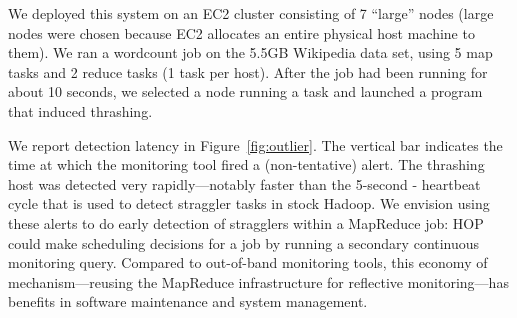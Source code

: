 We deployed this system on an EC2 cluster consisting of 7 ``large''
nodes (large nodes were chosen because EC2 allocates an entire
physical host machine to them). We ran a wordcount job on the 5.5GB Wikipedia
data set, using 5 map tasks and 2 reduce tasks (1 task per host). After
the job had been running for about 10 seconds, we selected a node
running a task and launched a program that induced thrashing.

We report detection latency in Figure~\ref{fig:outlier}. The vertical bar
indicates the time at which the monitoring tool fired a (non-tentative)
alert. The thrashing host was detected very rapidly---notably faster than the
5-second {\TT}-{\JT} heartbeat cycle that is used to detect straggler tasks in
stock Hadoop. We envision using these alerts to do early detection of stragglers
within a MapReduce job: HOP could make scheduling decisions for a job by running
a secondary continuous monitoring query. Compared to out-of-band monitoring
tools, this economy of mechanism---reusing the MapReduce infrastructure for
reflective monitoring---has benefits in software maintenance and system
management.

